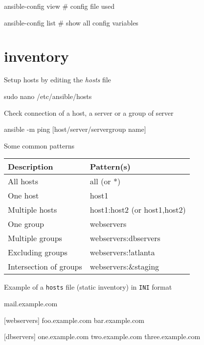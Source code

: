 \documentclass{refcard}
\begin{document}
\begin{ttyenv}
ansible-config view # config file used
\end{ttyenv}

\begin{ttyenv}
ansible-config list # show all config variables
\end{ttyenv}

\section{inventory}

Setup hosts by editing the \textit{hosts} file
\begin{ttyenv}
sudo nano /etc/ansible/hosts
\end{ttyenv}

Check connection of a host, a server or a group of server
\begin{ttyenv}
ansible -m ping [host/server/servergroup name]
\end{ttyenv}

Some common patterns
\begin{table}[!h]
    \centering
    \sffamily
    \begin{tabular}{|l|l|}
        \hline
        Description   & Pattern(s) \\
        \hline
        All hosts              & all (or *) \\
        One host               & host1      \\
        Multiple hosts         & host1:host2 (or host1,host2) \\
        One group              & webservers                   \\
        Multiple groups	       & webservers:dbservers         \\
        Excluding groups       & webservers:!atlanta          \\
        Intersection of groups & webservers:\&staging \\
        \hline
    \end{tabular}
\end{table}

Example of a \verb|hosts| file (static inventory) in \verb|INI| format
\begin{yamlbox}
mail.example.com

[webservers]
foo.example.com
bar.example.com

[dbservers]
one.example.com
two.example.com
three.example.com
\end{yamlbox}
\end{document}
